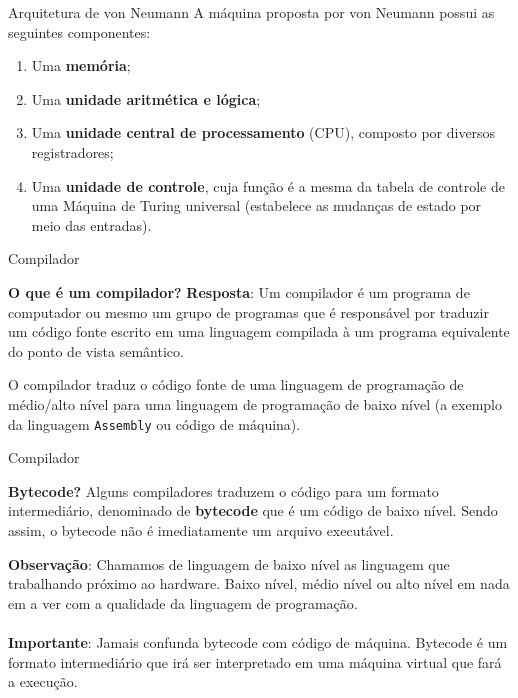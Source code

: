 \documentclass{beamer}
\begin{document}
\begin{frame}{Arquitetura de von Neumann}		
A máquina proposta por von Neumann possui as seguintes componentes:
			
\begin{enumerate}
\item Uma \textbf{memória};
\item Uma \textbf{unidade aritmética e lógica};
\item Uma \textbf{unidade central de processamento} (CPU), composto por diversos registradores;
\item Uma \textbf{unidade de controle}, cuja função é a mesma da tabela de controle de uma Máquina de Turing universal (estabelece as mudanças de estado por meio das entradas).
\end{enumerate}
\end{frame}

\begin{frame}{Compilador}
\begin{block}{\textbf{O que é um compilador?}}
\pause\textbf{Resposta}: Um compilador é um programa de computador ou mesmo um grupo de programas que é responsável por traduzir um código fonte escrito em uma linguagem compilada à um programa equivalente do ponto de vista semântico. 
\end{block}
\vspace{0.2cm}
\pause O compilador traduz o código fonte de uma linguagem de programação de médio/alto nível para uma linguagem de programação de baixo nível (a exemplo da linguagem \texttt{Assembly} ou código de máquina).
\end{frame}

\begin{frame}{Compilador}
\begin{block}{\textbf{Bytecode?}}
\pause Alguns compiladores traduzem o código para um formato intermediário, denominado de \textbf{bytecode} que é um código de baixo nível. Sendo assim, o bytecode não é imediatamente um arquivo executável.
\end{block}

\pause \textbf{Observação}: Chamamos de linguagem de baixo nível as linguagem que trabalhando próximo ao hardware. Baixo nível, médio nível ou alto nível em nada em a ver com a qualidade da linguagem de programação.\\~\\

\pause \textbf{Importante}: Jamais confunda bytecode com código de máquina. Bytecode é um formato intermediário que irá ser interpretado em uma máquina virtual que fará a execução. 
\end{frame}
\end{document}
